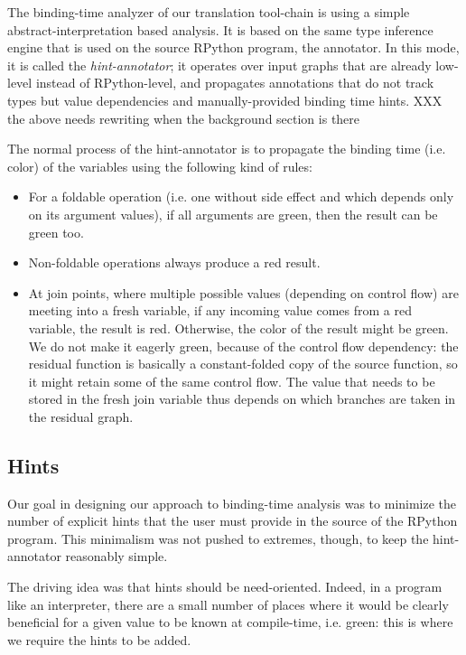 The binding-time analyzer of our translation tool-chain is using a simple
abstract-interpretation based analysis. It is based on the
same type inference engine that is used on the source RPython program,
the annotator.  In this mode, it is called the \emph{hint-annotator}; it
operates over input graphs that are already low-level instead of
RPython-level, and propagates annotations that do not track types but
value dependencies and manually-provided binding time hints.
XXX the above needs rewriting when the background section is there

The normal process of the hint-annotator is to propagate the binding
time (i.e. color) of the variables using the following kind of rules:

\begin{itemize}
\item For a foldable operation (i.e. one without side effect and which depends
only on its argument values), if all arguments are green, then the result can
be green too.

\item Non-foldable operations always produce a red result.

\item At join points, where multiple possible values (depending on control
flow) are meeting into a fresh variable, if any incoming value comes from a red
variable, the result is red.  Otherwise, the color of the result might be
green.  We do not make it eagerly green, because of the control flow
dependency: the residual function is basically a constant-folded copy of the
source function, so it might retain some of the same control flow.  The value
that needs to be stored in the fresh join variable thus depends on which
branches are taken in the residual graph.
\end{itemize}

\subsection{Hints}

Our goal in designing our approach to binding-time analysis was to
minimize the number of explicit hints that the user must provide in
the source of the RPython program.  This minimalism was not pushed to
extremes, though, to keep the hint-annotator reasonably simple.  

The driving idea was that hints should be need-oriented.  Indeed, in a
program like an interpreter, there are a small number of places where it
would be clearly beneficial for a given value to be known at
compile-time, i.e. green: this is where we require the hints to be
added.

